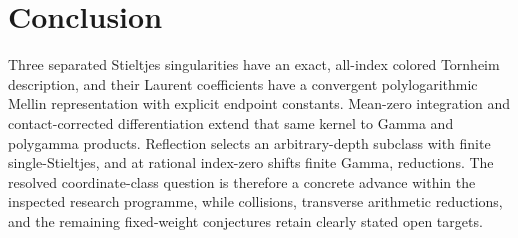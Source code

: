 \section*{Conclusion}
Three separated Stieltjes singularities have an exact, all-index colored
Tornheim description, and their Laurent coefficients have a convergent
polylogarithmic Mellin representation with explicit endpoint constants.
Mean-zero integration and contact-corrected differentiation extend that
same kernel to Gamma and polygamma products. Reflection selects an
arbitrary-depth subclass with finite single-Stieltjes, and at rational
index-zero shifts finite Gamma, reductions. The resolved coordinate-class
question is therefore a concrete advance within the inspected research
programme, while collisions, transverse arithmetic reductions, and the
remaining fixed-weight conjectures retain clearly stated open targets.
